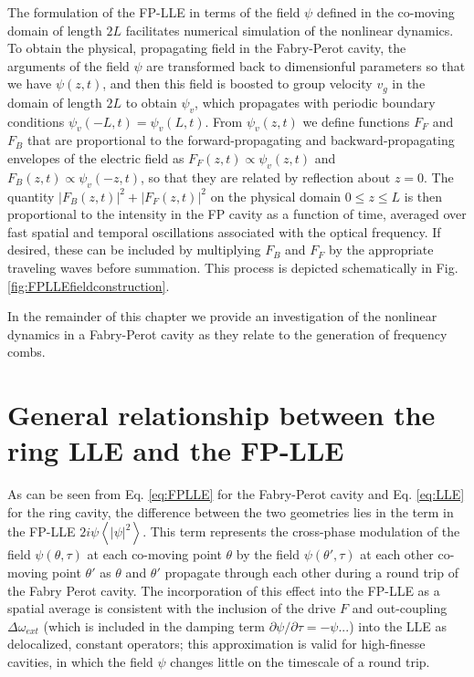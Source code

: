 The formulation of the FP-LLE in terms of the field $\psi$ defined in the co-moving domain of length $2L$ facilitates numerical simulation of the nonlinear dynamics. To obtain the physical, propagating field in the Fabry-Perot cavity, the arguments of the field $\psi$ are transformed back to dimensionful parameters so that we have $\psi(z,t)$, and then this field is boosted to group velocity $v_g$ in the domain of length $2L$ to obtain $\psi_v$, which propagates with periodic boundary conditions $\psi_v(-L,t)=\psi_v(L,t)$. From $\psi_v(z,t)$ we define functions $F_F$ and $F_B$ that are proportional to the forward-propagating and backward-propagating envelopes of the electric field as $F_F(z,t)\propto\psi_v(z,t)$ and $F_B(z,t)\propto\psi_v(-z,t)$, so that they are related by reflection about $z=0$. The quantity $|F_B(z,t)|^2+|F_F(z,t)|^2$ on the physical domain $0\leq z \leq L$ is then proportional to the intensity in the FP cavity as a function of time, averaged over fast spatial and temporal oscillations associated with the optical frequency. If desired, these can be included by multiplying $F_B$ and $F_F$ by the appropriate traveling waves before summation. This process is depicted schematically in Fig. \ref{fig:FPLLEfieldconstruction}.



In the remainder of this chapter we provide an investigation of the nonlinear dynamics in a Fabry-Perot cavity as they relate to the generation of frequency combs.

\section{General relationship between the ring LLE and the FP-LLE}
As can be seen from Eq. \ref{eq:FPLLE} for the Fabry-Perot cavity and Eq. \ref{eq:LLE} for the ring cavity, the difference between the two geometries lies in the term in the FP-LLE $2i\psi\left<|\psi|^2\right>$. This term represents the cross-phase modulation of the field $\psi(\theta,\tau)$ at each co-moving point $\theta$ by the field $\psi(\theta',\tau)$ at each other co-moving point $\theta'$ as $\theta$ and $\theta'$ propagate through each other during a round trip of the Fabry Perot cavity. The incorporation of this effect into the FP-LLE as a spatial average is consistent with the inclusion of the drive $F$ and out-coupling $\Delta\omega_{ext}$ (which is included in the damping term $\partial\psi/\partial\tau=-\psi...$) into the LLE as delocalized, constant operators; this approximation is valid for high-finesse cavities, in which the field $\psi$ changes little on the timescale of a round trip.

